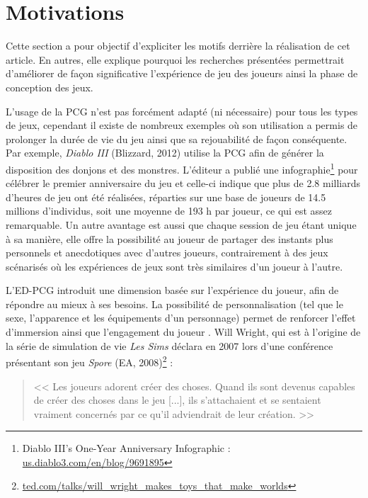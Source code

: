 \documentclass[a4paper,11pt]{article}
\begin{document}
    \section{Motivations}\label{section:motivations}
      
      Cette section a pour objectif d'expliciter les motifs derrière la réalisation de cet article.
      En autres, elle explique pourquoi les recherches présentées permettrait d'améliorer de façon significative l'expérience de jeu des joueurs ainsi la phase de conception des jeux. 

      L'usage de la PCG n'est pas forcément adapté (ni nécessaire) pour tous les types de jeux, cependant il existe de nombreux exemples où son utilisation a permis de prolonger la durée de vie du jeu ainsi que sa rejouabilité de façon conséquente.
      Par exemple, \textit{Diablo III} (Blizzard, 2012) utilise la PCG afin de générer la disposition des donjons et des monstres. 
      L'éditeur a publié une infographie\footnote{Diablo III’s One-Year Anniversary Infographic : \url{us.diablo3.com/en/blog/9691895}} pour célébrer le premier anniversaire du jeu et celle-ci indique que plus de 2.8 milliards d'heures de jeu ont été réalisées, réparties sur une base de joueurs de 14.5 millions d'individus, soit une moyenne de 193 h par joueur, ce qui est assez remarquable.
      Un autre avantage est aussi que chaque session de jeu étant unique à sa manière, elle offre la possibilité au joueur de partager des instants plus personnels et anecdotiques avec d'autres joueurs, contrairement à des jeux scénarisés où les expériences de jeux sont très similaires d'un joueur à l'autre.

      L'ED-PCG introduit une dimension basée sur l'expérience du joueur, afin de répondre au mieux à ses besoins.
      La possibilité de personnalisation (tel que le sexe, l'apparence et les équipements d'un personnage) permet de renforcer l'effet d'immersion ainsi que l'engagement du joueur \cite{Teng}.
      Will Wright, qui est à l'origine de la série de simulation de vie \textit{Les Sims} déclara en 2007 lors d'une conférence présentant son jeu \textit{Spore} (EA, 2008)\footnote{\url{ted.com/talks/will_wright_makes_toys_that_make_worlds}} :
      
      \begin{quote}
        \vspace{-1em}
        << Les joueurs adorent créer des choses.
        Quand ils sont devenus capables de créer des choses dans le jeu [...], ils s'attachaient et se sentaient vraiment concernés par ce qu'il adviendrait de leur création. >>
        \vspace{-1em}
      \end{quote}
      
\end{document}
